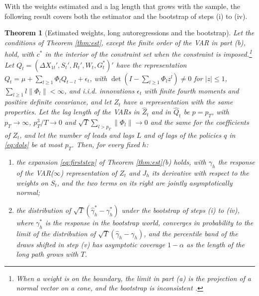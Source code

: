 \documentclass[12pt,a4paper]{article}
\newtheorem{thm}{Theorem}
\theoremstyle{definition}
\theoremstyle{definition}\newtheorem{example}{Example}
\theoremstyle{definition}\newtheorem{definition}{Definition}
\begin{document}
With the weights estimated and a lag length that grows with the sample, the following result covers both the estimator and the bootstrap of steps (i) to (iv).

\begin{thm}[Estimated weights, long autoregressions and the bootstrap\label{thm:joint}]
Let the conditions of Theorem \ref{thm:est}, except the finite order of the VAR in part (b), hold, with $c^\ast$ in the interior of the constraint set when the constraint is imposed.\footnote{When a weight is on the boundary, the limit in part (a) is the projection of a normal vector on a cone, and the bootstrap is inconsistent \citep{Andrews2000}.} Let $Q_t=(\Delta X_{1t}',S_t',R_t',W_t,G^\ast_t)'$ have the representation $Q_t=\mu+\sum_{l\geq1}\Phi_lQ_{t-l}+\epsilon_t$, with $\det(I-\sum_{l\geq1}\Phi_lz^l)\neq0$ for $|z|\leq1$, $\sum_{l\geq1}l\|\Phi_l\|<\infty$, and i.i.d. innovations $\epsilon_t$ with finite fourth moments and positive definite covariance, and let $Z_t$ have a representation with the same properties. Let the lag length of the VARs in $\hat Z_t$ and in $\hat Q_t$ be $p=p_T$, with $p_T\to\infty$, $p_T^3/T\to0$ and $\sqrt{T}\sum_{l>p_T}\|\Phi_l\|\to0$ and the same for the coefficients of $Z_t$, and let the number of leads and lags $L$ and of lags of the policies $q$ in \eqref{eq:dols} be at most $p_T$. Then, for every fixed $h$:
\begin{enumerate}
\item[(a)] the expansion \eqref{eq:firststep} of Theorem \ref{thm:est}(b) holds, with $\gamma_h$ the response of the VAR($\infty$) representation of $Z_t$ and $J_h$ its derivative with respect to the weights on $S_t$, and the two terms on its right are jointly asymptotically normal;
\item[(b)] the distribution of $\sqrt{T}(\hat\gamma^\ast_h-\gamma^\ast_h)$ under the bootstrap of steps (i) to (iv), where $\gamma^\ast_h$ is the response in the bootstrap world, converges in probability to the limit of the distribution of $\sqrt{T}(\hat\gamma_h-\gamma_h)$, and the percentile band of the draws shifted in step (v) has asymptotic coverage $1-\alpha$ as the length of the long path grows with $T$.
\end{enumerate}
\end{thm}
\end{document}
